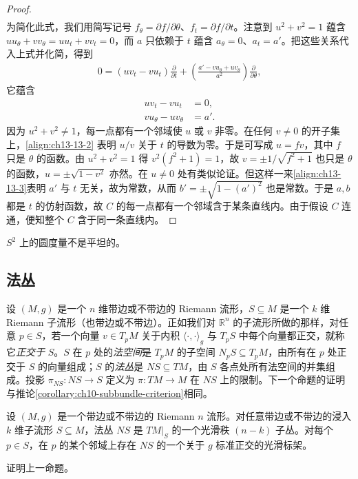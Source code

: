 \documentclass[../../main.tex]{subfiles}
\begin{document}
\begin{proof}
\begin{align*}
\end{align*}
为简化此式，我们用简写记号 $f_\theta=\partial f/\partial\theta$、$f_t=\partial f/\partial t$。注意到 $u^2+v^2=1$ 蕴含 $uu_\theta+vv_\theta=uu_t+vv_t=0$，而 $a$ 只依赖于 $t$ 蕴含 $a_\theta=0$、$a_t=a'$。把这些关系代入上式并化简，得到
\begin{align*}
0=(uv_t-vu_t)\frac{\partial}{\partial t}+\left(\frac{a'-vu_\theta+uv_\theta}{a^2}\right)\frac{\partial}{\partial\theta},
\end{align*}
它蕴含
\begin{align}
uv_t-vu_t&=0,\label{align:ch13-13-2}\\
vu_\theta-uv_\theta&=a'.\label{align:ch13-13-3}
\end{align}
因为 $u^2+v^2\ne1$，每一点都有一个邻域使 $u$ 或 $v$ 非零。在任何 $v\ne0$ 的开子集上，\eqref{align:ch13-13-2} 表明 $u/v$ 关于 $t$ 的导数为零。于是可写成 $u=fv$，其中 $f$ 只是 $\theta$ 的函数。由 $u^2+v^2=1$ 得 $v^2(f^2+1)=1$，故 $v=\pm1/\sqrt{f^2+1}$ 也只是 $\theta$ 的函数，$u=\pm\sqrt{1-v^2}$ 亦然。在 $u\ne0$ 处有类似论证。但这样一来\eqref{align:ch13-13-3}表明 $a'$ 与 $t$ 无关，故为常数，从而 $b'=\pm\sqrt{1-(a')^2}$ 也是常数。于是 $a,b$ 都是 $t$ 的仿射函数，故 $C$ 的每一点都有一个邻域含于某条直线内。由于假设 $C$ 连通，便知整个 $C$ 含于同一条直线内。
\end{proof}

\begin{corollary}\label{corollary:ch13-sphere-not-flat}
$S^2$ 上的圆度量不是平坦的。
\end{corollary}

\subsection{法丛}

设 $(M,g)$ 是一个 $n$ 维带边或不带边的 Riemann 流形，$S\subseteq M$ 是一个 $k$ 维 Riemann 子流形（也带边或不带边）。正如我们对 $\mathbb{R}^n$ 的子流形所做的那样，对任意 $p\in S$，若一个向量 $v\in T_pM$ 关于内积 $\langle\cdot,\cdot\rangle_g$ 与 $T_pS$ 中每个向量都正交，就称它\emph{正交于} $S$。$S$ 在 $p$ 处的\emph{法空间}是 $T_pM$ 的子空间 $N_pS\subseteq T_pM$，由所有在 $p$ 处正交于 $S$ 的向量组成；$S$ 的\emph{法丛}是 $NS\subseteq TM$，由 $S$ 各点处所有法空间的并集组成。投影 $\pi_{NS}:NS\to S$ 定义为 $\pi:TM\to M$ 在 $NS$ 上的限制。下一个命题的证明与推论\ref{corollary:ch10-subbundle-criterion}相同。

\begin{proposition}\label{proposition:ch13-normal-bundle}
设 $(M,g)$ 是一个带边或不带边的 Riemann $n$ 流形。对任意带边或不带边的浸入 $k$ 维子流形 $S\subseteq M$，法丛 $NS$ 是 $TM|_S$ 的一个光滑秩 $(n-k)$ 子丛。对每个 $p\in S$，在 $p$ 的某个邻域上存在 $NS$ 的一个关于 $g$ 标准正交的光滑标架。
\end{proposition}

\begin{exercise}\label{exercise:ch13-22}
证明上一命题。
\end{exercise}
\end{document}
